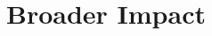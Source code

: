 \documentclass{article}
\theoremstyle{plain}
\theoremstyle{definition}
\theoremstyle{remark}
\newcommand{\todo}[1]{{\color{red}\ \!\Large\smash{\textbf{[}}{\normalsize\textsc{todo:} #1}\ \!\smash{\textbf{]}}}}
\numberwithin{equation}{section}
\begin{document}
	
	
	
	\section*{Broader Impact}
\end{document}
